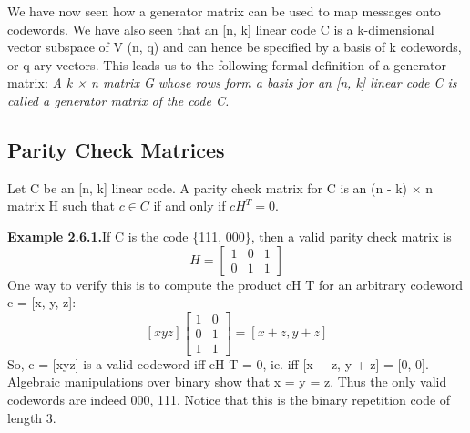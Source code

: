 \documentclass{article}
\begin{document}
We have now seen how a generator matrix can be used to map messages onto codewords. We have
also seen that an [n, k] linear code C is a k-dimensional vector subspace of V (n, q) and can hence be
specified by a basis of k codewords, or q-ary vectors. This leads us to the following formal definition
of a generator matrix: \emph{A k × n matrix G whose rows form a basis for an [n, k] linear code C is called a
generator matrix of the code C.}

\subsection{Parity Check Matrices}
Let C be an [n, k] linear code. A parity check matrix for C is an (n - k) × n
matrix H such that $c \in C$ if and only if $cH^T = 0$.

\textbf{Example 2.6.1.}If C is the code \{111, 000\}, then a valid parity check matrix is 
\[ H =
\begin{bmatrix}
1 & 0 & 1\\
0 & 1 & 1
\end{bmatrix}
\]
One way to verify this is to compute the product cH T for an arbitrary codeword c = [x, y, z]:
\[
[xyz]
\begin{bmatrix}
1 & 0 \\
0 & 1 \\
1 & 1
\end{bmatrix}
=
[x + z, y + z]
\]
So, c = [xyz] is a valid codeword iff cH T = 0, ie. iff [x + z, y + z] = [0, 0]. Algebraic manipulations
over binary show that x = y = z. Thus the only valid codewords are indeed {000, 111}. Notice that
this is the binary repetition code of length 3.
\end{document}
